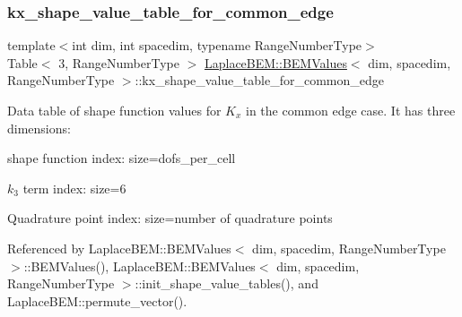 \mbox{\label{classLaplaceBEM_1_1BEMValues_a45a3db6a8850b758849542c0c2f9d48e}} 
\subsubsection{\texorpdfstring{kx\+\_\+shape\+\_\+value\+\_\+table\+\_\+for\+\_\+common\+\_\+edge}{kx\_shape\_value\_table\_for\_common\_edge}}
{\footnotesize\ttfamily template$<$int dim, int spacedim, typename Range\+Number\+Type$>$ \\
Table$<$ 3, Range\+Number\+Type $>$ \hyperlink{classLaplaceBEM_1_1BEMValues}{Laplace\+B\+E\+M\+::\+B\+E\+M\+Values}$<$ dim, spacedim, Range\+Number\+Type $>$\+::kx\+\_\+shape\+\_\+value\+\_\+table\+\_\+for\+\_\+common\+\_\+edge}

Data table of shape function values for $K_x$ in the common edge case. It has three dimensions\+:
\begin{DoxyEnumerate}
\item shape function index\+: size={\ttfamily dofs\+\_\+per\+\_\+cell} 
\item $k_3$ term index\+: size=6
\item Quadrature point index\+: size=number of quadrature points 
\end{DoxyEnumerate}

Referenced by Laplace\+B\+E\+M\+::\+B\+E\+M\+Values$<$ dim, spacedim, Range\+Number\+Type $>$\+::\+B\+E\+M\+Values(), Laplace\+B\+E\+M\+::\+B\+E\+M\+Values$<$ dim, spacedim, Range\+Number\+Type $>$\+::init\+\_\+shape\+\_\+value\+\_\+tables(), and Laplace\+B\+E\+M\+::permute\+\_\+vector().

\mbox{\label{classLaplaceBEM_1_1BEMValues_a84bdf210acf62ae9ba68326a98e3d306}} 
